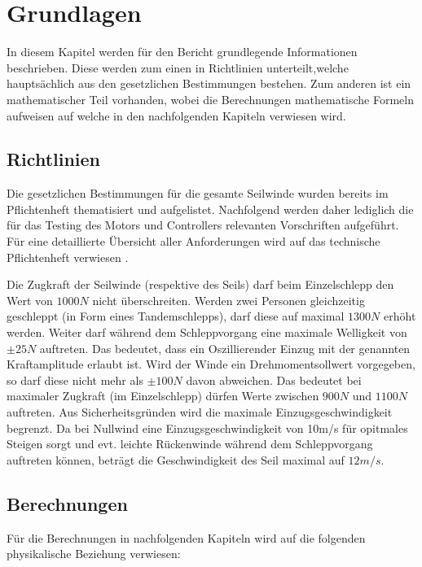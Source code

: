 \section{Grundlagen}\label{sec:Grundlagen}
In diesem Kapitel werden für den Bericht grundlegende Informationen beschrieben. Diese werden zum einen in Richtlinien unterteilt,welche hauptsächlich aus den gesetzlichen Bestimmungen bestehen. Zum anderen ist ein mathematischer Teil vorhanden, wobei die Berechnungen mathematische Formeln aufweisen auf welche in den nachfolgenden Kapiteln verwiesen wird. 

\subsection{Richtlinien}\label{subsec:Richtlinien}
Die gesetzlichen Bestimmungen für die gesamte Seilwinde wurden bereits im Pflichtenheft thematisiert und aufgelistet. Nachfolgend werden daher lediglich die für das Testing des Motors und Controllers relevanten Vorschriften aufgeführt. Für eine detaillierte Übersicht aller Anforderungen wird auf das technische Pflichtenheft verwiesen \cite{TechPflichtenheft}.

Die Zugkraft der Seilwinde (respektive des Seils) darf beim Einzelschlepp den Wert von $ 1000N $ nicht überschreiten. Werden zwei Personen gleichzeitig geschleppt (in Form eines Tandemschlepps), darf diese auf maximal $ 1300N $ erhöht werden. Weiter darf während dem Schleppvorgang eine maximale Welligkeit von $\pm 25N$ auftreten. Das bedeutet, dass ein Oszillierender Einzug mit der genannten Kraftamplitude erlaubt ist. Wird der Winde ein Drehmomentsollwert vorgegeben, so darf diese nicht mehr als $\pm 100N$ davon abweichen. Das bedeutet bei maximaler Zugkraft (im Einzelschlepp) dürfen Werte zwischen $ 900N $ und $ 1100N $ auftreten. Aus Sicherheitsgründen wird die maximale Einzugsgeschwindigkeit begrenzt. Da bei Nullwind eine Einzugsgeschwindigkeit von 10m/s für opitmales Steigen sorgt und evt. leichte Rückenwinde während dem Schleppvorgang auftreten können, beträgt die Geschwindigkeit des Seil maximal auf $ 12m/s $.



\subsection{Berechnungen}\label{subsec:Berechnungen}
Für die Berechnungen in nachfolgenden Kapiteln wird auf die folgenden physikalische Beziehung verwiesen:



